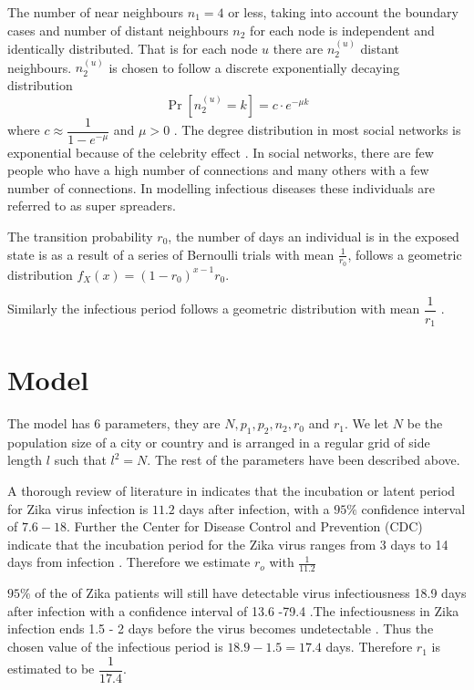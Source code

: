 The number of near neighbours $n_1 = 4$ or less, taking into account the boundary cases and number of distant neighbours $n_2$  for each node is independent and  identically distributed. That is for each node $u$ there are $n_2^ {(u)}$ distant neighbours. $n_2^ {(u)} $ is chosen to follow a discrete exponentially decaying distribution 
\begin{equation} 
 \Pr[n_2^{(u)} = k] = c \cdot e^{-\mu k  } \label{5.2.1}
 \end{equation}
 where $c \approx \dfrac{1}{1- e^{-\mu }}$ and $\mu >0$ \citep{fu2013propagation}.
 The degree distribution in most social networks is exponential because of the celebrity effect \citep{estrada2015first}. In social networks, there are few people who have a high number of connections and many others with a few number of connections. In modelling infectious diseases these individuals are referred to as super spreaders.

 The transition probability $r_0$, the number of days an individual is in the exposed state is as a result of a series of Bernoulli trials with mean $\frac{1}{r_0}$, follows a geometric distribution $f_X (x) = (1-r_0) ^ {x-1} r_0$.

 Similarly the infectious period follows a geometric distribution with mean $\dfrac{1}{r_1}$ \citep{fu2013propagation}.

\section{Model}
The model has 6 parameters, they are $N, p_1, p_2, n_2, r_0$ and $r_1$. We let $N$ be the population size of a city or country and is arranged in a regular grid of side length $l $ such that $l^2 = N$. The rest of the parameters have been described above.

A thorough review of literature in \cite{lessler2016times} indicates that the incubation or latent period for Zika virus infection is $11.2$ days after infection, with a $95 \%$ confidence interval of $7.6 -18$. Further the Center for Disease Control and Prevention (CDC) indicate that the incubation period for the Zika virus ranges from 3 days to 14 days from infection \citep{krow2017estimated}. Therefore we estimate $r_o$ with $\frac{1}{11.2}$
  
    $95\%$ of the of Zika patients will still have detectable virus infectiousness 18.9 days after infection with a confidence interval of 13.6 -79.4 \citep{lessler2016times}.The infectiousness in Zika infection ends 1.5 - 2 days before the virus becomes undetectable \citep{funk2016comparative}. Thus the chosen value of the infectious period is $18.9 - 1.5 = 17.4$ days. Therefore $r_1$ is estimated to be $\dfrac{1}{17.4}$.

